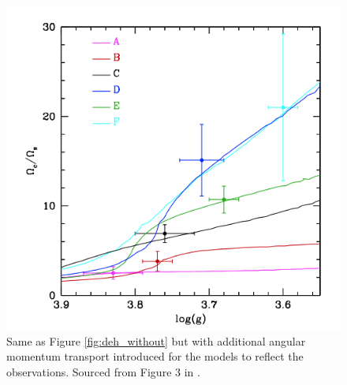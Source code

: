 \begin{figure}[h]
    \includegraphics[width=\textwidth]{Figures/intro_figures/deheuvels_disparity_with.png}
    \caption[A comparison of modelled and observed core to surface rotation rate ratios of post-main sequence stars with additional angular momentum transport.]{Same as Figure \ref{fig:deh_without} but with additional angular momentum transport introduced for the models to reflect the observations.
    Sourced from Figure 3 in \citep{eggenberger_asteroseismology_2019}.}
    \label{fig:deh_with}
\end{figure}


